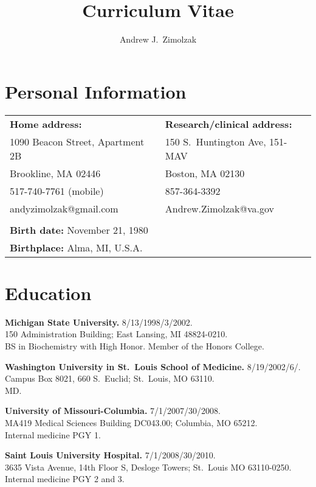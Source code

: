 \documentclass[10pt]{article}
\title{Curriculum Vitae}
\author{Andrew J.\ Zimolzak}
\begin{document}
\thispagestyle{fancy}

\section*{Personal Information}

\begin{tabular}{l l}
\textbf{Home address:}           & \textbf{Research/clinical address:}\\
1090 Beacon Street, Apartment 2B & 150 S.\ Huntington Ave, 151-MAV\\
Brookline, MA 02446              & Boston, MA 02130\\
517-740-7761 (mobile)            & 857-364-3392\\
andyzimolzak@gmail.com           & Andrew.Zimolzak@va.gov\\
\\
\textbf{Birth date:} November 21, 1980\\
\textbf{Birthplace:} Alma, MI, U.S.A.
\end{tabular}

\section*{Education}

\textbf{Michigan State University.} 8/13/1998/3/2002.\\
150 Administration Building; East Lansing, MI 48824-0210.\\
BS in Biochemistry with High Honor. Member of the Honors College.

\textbf{Washington University in St.\ Louis School of Medicine.}
8/19/2002\ndash{}/6/.\\
Campus Box 8021, 660 S.\ Euclid; St.\ Louis, MO 63110.\\
MD.

\textbf{University of Missouri-Columbia.} 7/1/2007/30/2008.\\
MA419 Medical Sciences Building DC043.00; Columbia, MO 65212.\\
Internal medicine PGY 1.

\textbf{Saint Louis University Hospital.} 7/1/2008/30/2010.\\
3635 Vista Avenue, 14th Floor S, Desloge Towers; St.\ Louis MO
63110-0250.\\
Internal medicine PGY 2 and 3.
\end{document}

